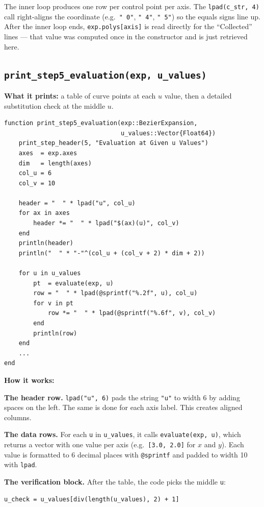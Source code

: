 \documentclass[12pt, a4paper]{article}
\newcommand{\cd}[1]{\texttt{#1}}
\begin{document}
The inner loop produces one row per control point per axis.
The \cd{lpad(c\_str, 4)} call right-aligns the coordinate
(e.g.\ \cd{"   0"}, \cd{"   4"}, \cd{"   5"}) so the equals
signs line up.
After the inner loop ends, \cd{exp.polys[axis]} is read directly
for the ``Collected'' lines --- that value was computed once in
the constructor and is just retrieved here.

\subsection{\texttt{print\_step5\_evaluation(exp, u\_values)}}

\textbf{What it prints:} a table of curve points at each $u$ value,
then a detailed substitution check at the middle $u$.

\begin{verbatim}
function print_step5_evaluation(exp::BezierExpansion,
                                u_values::Vector{Float64})
    print_step_header(5, "Evaluation at Given u Values")
    axes  = exp.axes
    dim   = length(axes)
    col_u = 6
    col_v = 10

    header = "  " * lpad("u", col_u)
    for ax in axes
        header *= "  " * lpad("$(ax)(u)", col_v)
    end
    println(header)
    println("  " * "-"^(col_u + (col_v + 2) * dim + 2))

    for u in u_values
        pt  = evaluate(exp, u)
        row = "  " * lpad(@sprintf("%.2f", u), col_u)
        for v in pt
            row *= "  " * lpad(@sprintf("%.6f", v), col_v)
        end
        println(row)
    end
    ...
end
\end{verbatim}

\textbf{How it works:}

\textbf{The header row.}
\cd{lpad("u", 6)} pads the string \cd{"u"} to width 6
by adding spaces on the left.
The same is done for each axis label.
This creates aligned columns.

\textbf{The data rows.}
For each \cd{u} in \cd{u\_values}, it calls \cd{evaluate(exp, u)},
which returns a vector with one value per axis
(e.g.\ \cd{[3.0, 2.0]} for $x$ and $y$).
Each value is formatted to 6 decimal places with \cd{@sprintf}
and padded to width 10 with \cd{lpad}.

\textbf{The verification block.}
After the table, the code picks the middle \cd{u}:

\begin{verbatim}
u_check = u_values[div(length(u_values), 2) + 1]
\end{verbatim}
\end{document}
